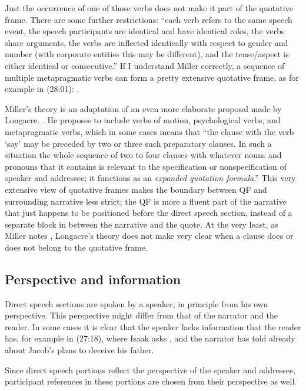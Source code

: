 \documentclass[twoside,a4paper,10pt]{article}
\newcommand{\cl}[2]{\begingroup\beginL\begingroup\color{#1}\beginR#2\endR\endgroup\endL\endgroup}
\newcommand{\hebr}[1]{\cjRL{#1}}
\begin{document}
\autocite[210-212]{Miller}

Just the occurrence of one of those verbs does not make it part of the quotative frame. There are some further restrictions: ``each verb refers to the same speech event, the speech participants are identical and have identical roles, the verbs share arguments, the verbs are inflected identically with respect to gender and number (with corporate entities this may be different), and the tense/aspect is either identical or consecutive.'' \autocite[204-205]{Miller} If I understand Miller correctly, a sequence of multiple metapragmatic verbs can form a pretty extensive quotative frame, as for example in (28:01): \hebr{\cl{red}{W JQR>} JYXQ >L J<QB \cl{red}{W JBRK} >TW \cl{red}{W JYWHW} \cl{red}{W J>MR} LW}.

Miller's theory is an adaptation of an even more elaborate proposal made by Longacre. \autocite{Longacre}. He proposes to include verbs of motion, psychological verbs, and metapragmatic verbs, which in some cases means that ``the clause with the verb `say' may be preceded by two or three such preparatory clauses. In such a situation the whole sequence of two to four clauses with whatever nouns and pronouns that it contains is relevant to the specification or nonspecification of speaker and addressee; it functions as an \emph{expanded quotation formula}.'' \autocite[160]{Longacre}
This very extensive view of quotative frames makes the boundary between QF and surrounding narrative less strict; the QF is more a fluent part of the narrative that just happens to be positioned before the direct speech section, instead of a separate block in between the narrative and the quote. 
At the very least, as Miller notes \autocite[204-205]{Miller}, Longacre's theory does not make very clear when a clause does or does not belong to the quotative frame.

\subsection{Perspective and information}
Direct speech sections are spoken by a speaker, in principle from his own perspective. This perspective might differ from that of the narrator and the reader. In some cases it is clear that the speaker lacks information that the reader has, for example in (27:18), where Isaak asks \hebr{MJ >TH BNJ}, and the narrator has told already about Jacob's plans to deceive his father.

Since direct speech portions reflect the perspective of the speaker and addressee, participant references in these portions are chosen from their perspective as well.
\end{document}
